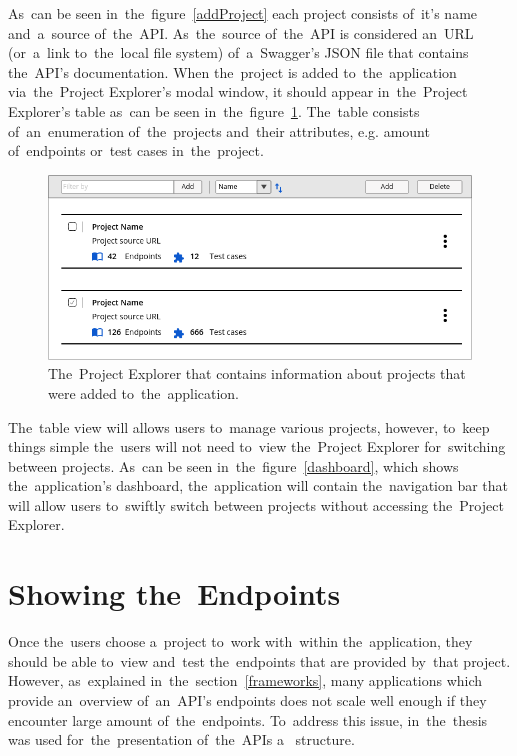 As~can be seen in~the~figure~\ref{addProject} each project consists of~it's name
and~a~source of~the~API. As~the~source of~the~API is considered an~URL
(or~a~link to~the~local file system) of~a~Swagger's JSON file that contains
the~API's documentation. When the~project is added to~the~application
via~the~Project Explorer's modal window, it should appear in~the~Project
Explorer's table as~can be seen in~the~figure~\ref{projectExplorer}. The~table
consists of~an~enumeration of~the~projects and~their attributes, e.g. amount
of~endpoints or~test cases in~the~project.

\begin{figure}[!hbt]
	\centering
	\includegraphics[scale=0.4]{./designs/drafts-1.0/project-explorer.png}
	\caption{The~Project Explorer that contains information about projects that
	were added to~the~application.}
	\label{projectExplorer}
\end{figure}

The~table view will allows users to~manage various projects, however, to~keep
things simple the~users will not need to~view the~Project Explorer for~switching
between projects. As~can be seen in~the~figure~\ref{dashboard}, which shows
the~application's dashboard, the~application will contain the~navigation bar
that will allow users to~swiftly switch between projects without accessing
the~Project Explorer.

\section{Showing the~Endpoints}
Once the~users choose a~project to~work with~within the~application, they should
be able to~view and~test the~endpoints that are provided by~that project.
However, as~explained in~the~section~\ref{frameworks}, many applications which
provide an~overview of~an~API's endpoints does not scale well enough if they
encounter large amount of~the~endpoints. To~address this issue, in~the~thesis
was used for~the~presentation of~the~APIs a~ structure.

